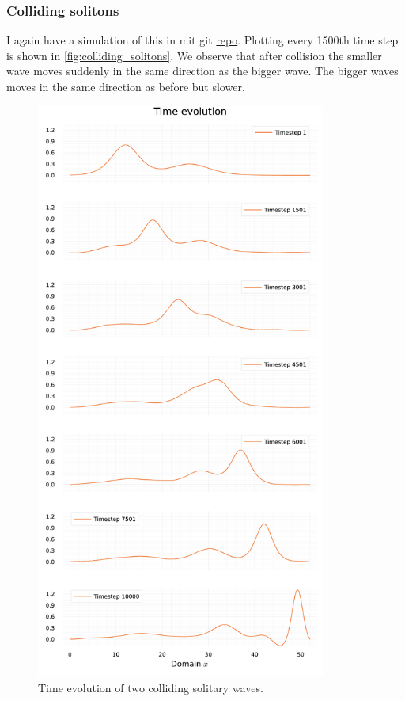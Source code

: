 \documentclass[
	a4paper, %
	10pt, %
]{CSUniSchoolLabReport}
\begin{document}
\subsubsection{Colliding solitons}

I again have a simulation of this in mit git \href{https://github.com/simonblaue/MCP-Ex4.git}{repo}. Plotting every 1500th time step is shown in \autoref{fig:colliding_solitons}. We observe that after collision the smaller wave moves suddenly in the same direction as the bigger wave. The bigger waves moves in the same direction as before but slower. 

\begin{figure}
	\centering
	\includegraphics[width=0.85\textwidth]{../saves_t3/colliding_solitons.pdf}
	\caption{Time evolution of two colliding solitary waves.}
	\label{fig:colliding_solitons}
\end{figure}
\end{document}
